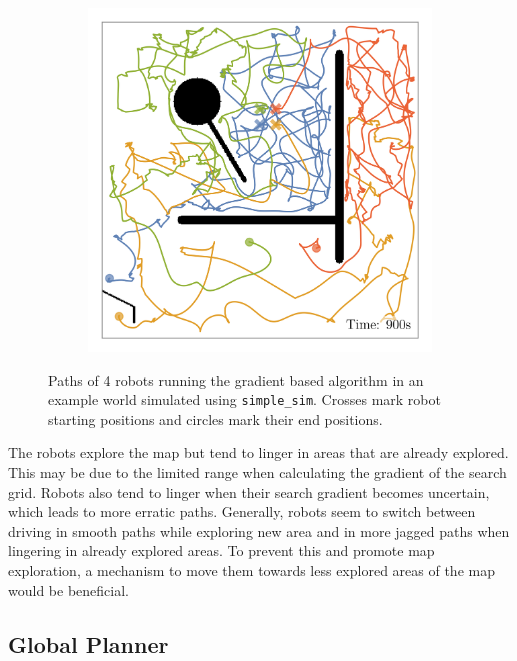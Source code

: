 \begin{figure}[H]
\begin{subfigure}[b]{\w}
    \end{subfigure}
    \begin{subfigure}[b]{\w}
        \centering
        \includegraphics[width=\textwidth]{./figures/plots/gradient-paths/search:gradient-paths-(after-900s).png}
    \end{subfigure}
    \caption{Paths of 4 robots running the gradient based algorithm in an example world simulated using \texttt{simple\_sim}. Crosses mark robot starting positions and circles mark their end positions.}
    \label{fig:gradient-paths}
\end{figure}

The robots explore the map but tend to linger in areas that are already explored. 
This may be due to the limited range when calculating the gradient of the search grid. Robots also tend to linger when their search gradient becomes uncertain, which leads to more erratic paths. Generally, robots seem to switch between driving in smooth paths while exploring new area and in more jagged paths when lingering in already explored areas. To prevent this and promote map exploration, a mechanism to move them towards less explored areas of the map would be beneficial.

\subsection{Global Planner}

